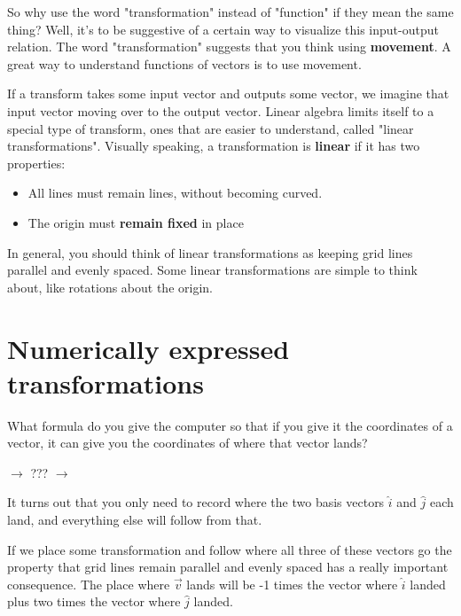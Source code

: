 \documentclass[12pt]{article}
\begin{document}
So why use the word "transformation" instead of "function" if they mean the same thing? Well, it's to be suggestive of a certain way to visualize this input-output relation. The word "transformation" suggests that you think using \textbf{movement}. A great way to understand functions of vectors is to use movement.

If a transform takes some input vector and outputs some vector, we imagine that input vector moving over to the output vector. Linear algebra limits itself to a special type of transform, ones that are easier to understand, called "linear transformations". Visually speaking, a transformation is \textbf{linear} if it has two properties:

\begin{itemize}
    \item All lines must remain lines, without becoming curved.
    \item The origin must \textbf{remain fixed} in place
\end{itemize}


In general, you should think of linear transformations as keeping grid lines parallel and evenly spaced. Some linear transformations are simple to think about, like rotations about the origin.


\section{Numerically expressed transformations}

What formula do you give the computer so that if you give it the coordinates of a vector, it can give you the coordinates of where that vector lands?

\begin{center}
     $\longrightarrow$ ??? $\longrightarrow$ 
\end{center}

It turns out that you only need to record where the two basis vectors $\hat{i}$ and $\hat{j}$ each land, and everything else will follow from that.


If we place some transformation and follow where all three of these vectors go the property that grid lines remain parallel and evenly spaced has a really important consequence. The place where $\vec{v}$ lands will be -1 times the vector where $\hat{i}$ landed plus two times the vector where $\hat{j}$ landed.
\end{document}
